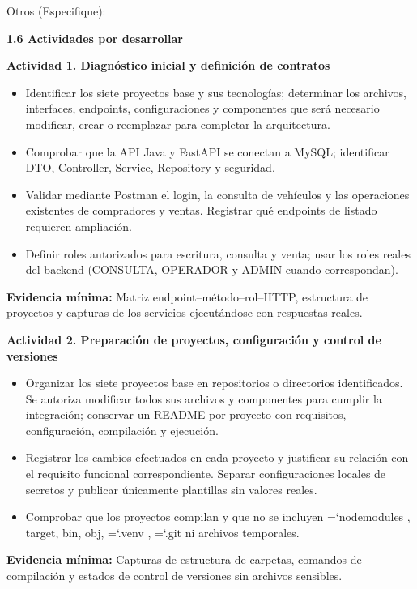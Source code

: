 \documentclass[11pt,a4paper]{article}
\renewcommand{\_}{\oldunderscore\allowbreak}
\DeclareRobustCommand{\texttt}[1]{%
  {\upshape\ttfamily\fontsize{9}{10.8}\selectfont\hyphenchar\font=`\-\relax #1}%
}
\begin{document}
\noindent Otros (Especifique): \underline{\hspace{6cm}}

\vspace{0.3cm}

\noindent\textbf{1.6 Actividades por desarrollar}

\vspace{0.2cm}

\noindent\textbf{Actividad 1. Diagnóstico inicial y definición de contratos}
\begin{itemize}[leftmargin=*,itemsep=2pt,topsep=2pt]
  \item Identificar los siete proyectos base y sus tecnologías; determinar los archivos, interfaces, endpoints, configuraciones y componentes que será necesario modificar, crear o reemplazar para completar la arquitectura.
  \item Comprobar que la API Java y FastAPI se conectan a MySQL; identificar DTO, Controller, Service, Repository y seguridad.
  \item Validar mediante Postman el login, la consulta de vehículos y las operaciones existentes de compradores y ventas. Registrar qué endpoints de listado requieren ampliación.
  \item Definir roles autorizados para escritura, consulta y venta; usar los roles reales del backend (CONSULTA, OPERADOR y ADMIN cuando correspondan).
\end{itemize}
\textbf{Evidencia mínima:} Matriz endpoint–método–rol–HTTP, estructura de proyectos y capturas de los servicios ejecutándose con respuestas reales.

\vspace{0.2cm}

\noindent\textbf{Actividad 2. Preparación de proyectos, configuración y control de versiones}
\begin{itemize}[leftmargin=*,itemsep=2pt,topsep=2pt]
  \item Organizar los siete proyectos base en repositorios o directorios identificados. Se autoriza modificar todos sus archivos y componentes para cumplir la integración; conservar un README por proyecto con requisitos, configuración, compilación y ejecución.
  \item Registrar los cambios efectuados en cada proyecto y justificar su relación con el requisito funcional correspondiente. Separar configuraciones locales de secretos y publicar únicamente plantillas sin valores reales.
  \item Comprobar que los proyectos compilan y que no se incluyen \texttt{node\_modules}, target, bin, obj, \texttt{.venv}, \texttt{.git} ni archivos temporales.
\end{itemize}
\textbf{Evidencia mínima:} Capturas de estructura de carpetas, comandos de compilación y estados de control de versiones sin archivos sensibles.
\end{document}
